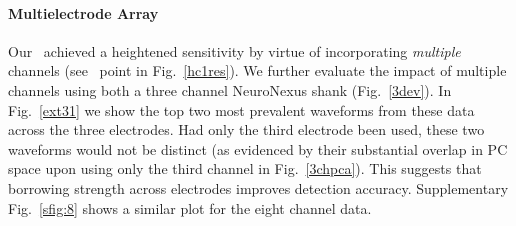 \paragraph{Multielectrode Array} \label{sub:multi}


Our \smug\ achieved a heightened sensitivity by virtue of incorporating \emph{multiple} channels (see \smug\ point in Fig.\ \ref{hc1res}).  
We further evaluate the impact of multiple channels using both a three channel NeuroNexus shank (Fig.\ \ref{3dev}). In Fig.\ \ref{ext31} we show the top two most prevalent waveforms from these data across the three electrodes.  Had only the third electrode been used, these two waveforms would not be distinct (as evidenced by their substantial overlap in PC space upon using only the third channel in Fig.\ \ref{3chpca}).  This suggests that borrowing strength across electrodes improves detection accuracy. Supplementary Fig.\ \ref{sfig:8} shows a similar plot for the eight channel data.  







